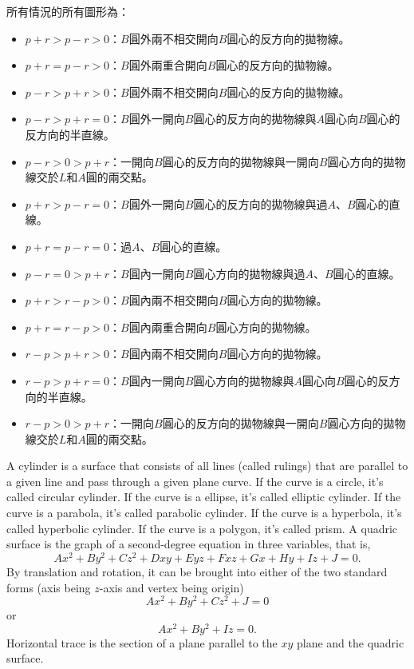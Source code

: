 \documentclass[a4paper,12pt]{report}
\begin{document}
所有情況的所有圖形為：
\begin{itemize}
\item $p+r>p-r>0$：$B$圓外兩不相交開向$B$圓心的反方向的拋物線。
\item $p+r=p-r>0$：$B$圓外兩重合開向$B$圓心的反方向的拋物線。
\item $p-r>p+r>0$：$B$圓外兩不相交開向$B$圓心的反方向的拋物線。
\item $p-r>p+r=0$：$B$圓外一開向$B$圓心的反方向的拋物線與$A$圓心向$B$圓心的反方向的半直線。
\item $p-r>0>p+r$：一開向$B$圓心的反方向的拋物線與一開向$B$圓心方向的拋物線交於$L$和$A$圓的兩交點。
\item $p+r>p-r=0$：$B$圓外一開向$B$圓心的反方向的拋物線與過$A$、$B$圓心的直線。
\item $p+r=p-r=0$：過$A$、$B$圓心的直線。
\item $p-r=0>p+r$：$B$圓內一開向$B$圓心方向的拋物線與過$A$、$B$圓心的直線。
\item $p+r>r-p>0$：$B$圓內兩不相交開向$B$圓心方向的拋物線。
\item $p+r=r-p>0$：$B$圓內兩重合開向$B$圓心方向的拋物線。
\item $r-p>p+r>0$：$B$圓內兩不相交開向$B$圓心方向的拋物線。
\item $r-p>p+r=0$：$B$圓內一開向$B$圓心方向的拋物線與$A$圓心向$B$圓心的反方向的半直線。
\item $r-p>0>p+r$：一開向$B$圓心的反方向的拋物線與一開向$B$圓心方向的拋物線交於$L$和$A$圓的兩交點。
\end{itemize}
A cylinder is a surface that consists of all lines (called rulings) that are parallel to a given line and pass through a given plane curve. If the curve is a circle, it's called circular cylinder. If the curve is a ellipse, it's called elliptic cylinder. If the curve is a parabola, it's called parabolic cylinder. If the curve is a hyperbola, it's called hyperbolic cylinder. If the curve is a polygon, it's called prism.
A quadric surface is the graph of a second-degree equation in three variables, that is,
\[Ax^2+By^2+Cz^2+Dxy+Eyz+Fxz+Gx+Hy+Iz+J=0.\]
By translation and rotation, it can be brought into either of the two standard forms (axis being $z$-axis and vertex being origin)
\[Ax^2+By^2+Cz^2+J=0\]
or
\[Ax^2+By^2+Iz=0.\]
Horizontal trace is the section of a plane parallel to the $xy$ plane and the quadric surface.
\end{document}
